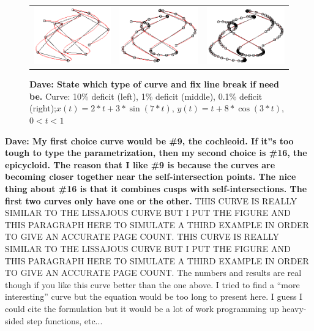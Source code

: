 \begin{figure}[h!]
  \centering
  \begin{tabular}{ccc}
  \includegraphics[width=0.3\linewidth]{Figures/random01.png} &
  \includegraphics[width=0.3\linewidth]{Figures/random001.png} &
  \includegraphics[width=0.3\linewidth]{Figures/random0001.png}
  \end{tabular}
  \caption{\label{fig:lastfigure} {\bf{Dave:  State which type of 
curve and fix line break if need be.}} Curve: 10\% deficit (left), 1\% 
deficit 
(middle), 0.1\% deficit (right);\newline $x(t) = 2*t + 3*\sin(7*t)$, $y(t) 
= t + 8*\cos(3*t)$, $0<t<1$}
\end{figure}

{\bf{Dave:  My first choice curve would be \#9, the cochleoid.  If it''s 
too tough to type the parametrization, then my second choice is \#16, the 
epicycloid.  The reason that I like \#9 is because the curves are becoming 
closer together near the self-intersection points.  The nice thing about 
\#16 is that it combines cusps with self-intersections.  The first two 
curves only have one or the other.}}
THIS CURVE IS REALLY SIMILAR TO THE LISSAJOUS CURVE BUT I PUT THE FIGURE AND THIS PARAGRAPH HERE TO SIMULATE A THIRD EXAMPLE IN ORDER TO GIVE AN ACCURATE PAGE COUNT. THIS CURVE IS REALLY SIMILAR TO THE LISSAJOUS CURVE BUT I PUT THE FIGURE AND THIS PARAGRAPH HERE TO SIMULATE A THIRD EXAMPLE IN ORDER TO GIVE AN ACCURATE PAGE COUNT. The numbers and results are real though if you like this curve better than the one above. I tried to find a ``more interesting'' curve but the equation would be too long to present here. I guess I could cite the formulation but it would be a lot of work programming up heavy-sided step functions, etc...

